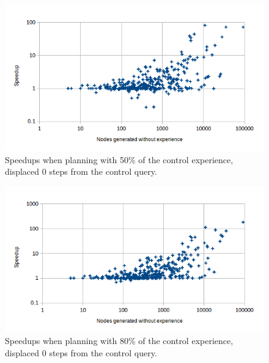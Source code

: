\documentclass[letterpaper]{article}
\begin{document}
\begin{figure}
	\begin{center}
	\includegraphics[scale=0.5]{Speedup_50_0.png}
	\end{center}
	\caption{Speedups when planning with 50\% of the control experience, displaced 0 steps from the control query.}
	 \label{fig:s_50_0}
\end{figure}

\begin{figure}
	\begin{center}
	\includegraphics[scale=0.5]{Speedup_80_0.png}
	\end{center}
	\caption{Speedups when planning with 80\% of the control experience, displaced 0 steps from the control query.}
	 \label{fig:s_80_0}
\end{figure}
\end{document}

